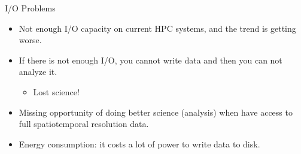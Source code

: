 \documentclass[compress,11pt,xcolor=svgnames,aspectratio=169]{beamer}
\begin{document}
\begin{frame}[fragile]{I/O Problems}

\begin{itemize}
\setlength\itemsep{0.7cm}

\item Not enough I/O capacity on current HPC systems, and the trend is getting worse.

\item If there is not enough I/O, you cannot write data and then you can not analyze it.
    \begin{itemize}
        \item Lost science!
    \end{itemize}

\item Missing opportunity of doing better science (analysis) when have access to full spatiotemporal resolution data.

\item Energy consumption: it costs a lot of power to write data to disk.

\end{itemize}

\nocite{sensei-sc17}

\end{frame}
\end{document}
